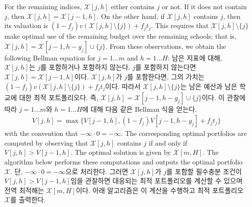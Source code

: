 \documentclass[11pt]{article} %
\theoremstyle{definition}
\theoremstyle{definition}
\begin{document}
\ifen
For the remaining indices, $\mathcal{X}[j, h]$ either contains $j$ or not. If it does not contain $j$, then $\mathcal{X}[j, h] = \mathcal{X}[j-1, h]$. On the other hand, if  $\mathcal{X}[j, h]$ contains $j$, then its valuation is $(1 - f_j) v(\mathcal{X}[j, h]\setminus \{j\}) + f_j t_j$. This requires that $\mathcal{X}[j, h]\setminus \{j\}$ make optimal use of the remaining budget over the remaining schools; that is, $\mathcal{X}[j, h] = \mathcal{X}[j-1, h - g_j] \cup\{j\}$. From these observations, we obtain the following Bellman equation for $ j = 1\dots m$ and $h = 1\dots H$:
\else
남은 지표에 대해, $\mathcal{X}[j, h]$는 $j$를 포함하거나 포함하지 않는다. $j$를 포함하지 않는다면 $\mathcal{X}[j, h] = \mathcal{X}[j-1, h]$이다. $\mathcal{X}[j, h]$가 $j$를 포함한다면, 그의 가치는  $(1 - f_j) v(\mathcal{X}[j, h]\setminus \{j\}) + f_j t_j$이다. 따라서 $\mathcal{X}[j, h]\setminus \{j\}$는 남은 예산과 남은 학교에 대한 최적 포트폴리오다. 즉,  $\mathcal{X}[j, h] = \mathcal{X}[j-1, h - g_j] \cup\{j\}$이다. 이 관찰에 따라 $ j = 1\dots m$와 $h = 1\dots H$에 대해 다음 같은 Bellman 식을 얻는다.
\fi
\begin{align}
V[j, h] = \max\bigl\{ V[j-1, h], (1 - f_j) V[j-1, h-g_j] + f_j t_j \bigr\}
\end{align}
\ifen 
with the convention that $ -\infty \cdot 0 = -\infty$. The corresponding optimal portfolios are computed by observing that $\mathcal{X}[j, h]$ contains $j$ if and only if $V[j, h]> V[j-1, h]$. The optimal solution is given by $\mathcal{X}[m, H]$. The algorithm below performs these computations and outputs the optimal portfolio $\mathcal{X}$. 
\else
단, $ -\infty \cdot 0 = -\infty$으로 처리한다. 그러면 $\mathcal{X}[j, h]$가  $j$를 포함할 필수충분 조건이 $V[j, h]> V[j-1, h]$임을 관찰하면 대응되는 최적 포트폴리오를 계산할 수 있으며 전역 최적해는 $\mathcal{X}[m, H]$이다. 아래 알고리즘은 이 계산을 수행하고 최적 포트폴리오 $\mathcal{X}$를 출력한다.
\fi
\end{document}
